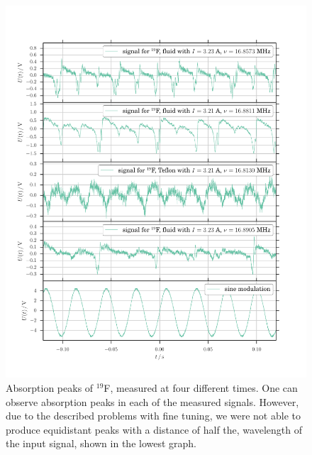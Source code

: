 \begin{figure}
	\includegraphics[width=\textwidth]{figures/f_r_F.pdf}
	\caption{
		Absorption peaks of $^{19}$F, measured 
		at four different times. One can observe absorption peaks in each of
		the measured signals. However, due to the described problems with fine tuning,
		we were not able to produce equidistant peaks with a distance of half the,
		wavelength of the input signal, shown in the lowest graph.
		}
	\label{fig:f_r_F}
\end{figure}

